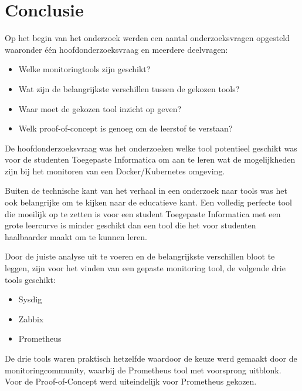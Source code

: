 
\chapter{Conclusie}
\label{ch:conclusie}

Op het begin van het onderzoek werden een aantal onderzoeksvragen opgesteld waaronder één hoofdonderzoeksvraag en meerdere deelvragen:

\begin{itemize}
    \item Welke monitoringtools zijn geschikt?
    \item Wat zijn de belangrijkste verschillen tussen de gekozen tools?
    \item Waar moet de gekozen tool inzicht op geven?
    \item Welk proof-of-concept is genoeg om de leerstof te verstaan?
\end{itemize}

De hoofdonderzoeksvraag was het onderzoeken welke tool potentieel geschikt was voor de studenten Toegepaste Informatica om aan te leren wat de mogelijkheden zijn bij het monitoren van een Docker/Kubernetes omgeving.  

Buiten de technische kant van het verhaal in een onderzoek naar tools was het ook belangrijke om te kijken naar de educatieve kant. Een volledig perfecte tool die moeilijk op te zetten is voor een student Toegepaste Informatica met een grote leercurve is minder geschikt dan een tool die het voor studenten haalbaarder maakt om te kunnen leren. 

Door de juiste analyse uit te voeren en de belangrijkste verschillen bloot te leggen, zijn voor het vinden van een gepaste monitoring tool, de volgende drie tools geschikt:

\begin{itemize}
    \item Sysdig
    \item Zabbix
    \item Prometheus
\end{itemize}

De drie tools waren praktisch hetzelfde waardoor de keuze werd gemaakt door de monitoringcommunity, waarbij de Prometheus tool met voorsprong uitblonk. Voor de Proof-of-Concept werd uiteindelijk voor Prometheus gekozen. 

